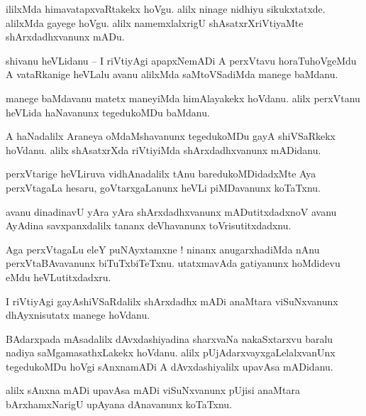 \documentclass{article}
\begin{document}
\begin{mn}%
ililxMda himavatapxvaRtakekx hoVgu. alilx ninage nidhiyu sikukxtatxde. alilxMda gayege hoVgu. alilx 
namemxlalxrigU shAsatxrXriVtiyaMte shArxdadhxvanunx mADu.
\end{mn}

\begin{mn}%
shivanu heVLidanu -- I riVtiyAgi apapxNemADi A perxVtavu horaTuhoVgeMdu A vataRkanige heVLalu avanu 
alilxMda saMtoVSadiMda manege baMdanu.
\end{mn}

\begin{mn}%
manege baMdavanu matetx maneyiMda himAlayakekx hoVdanu. alilx perxVtanu heVLida haNavanunx 
tegedukoMDu baMdanu.
\end{mn}

\begin{mn}%
A haNadalilx Araneya oMdaMshavanunx tegedukoMDu gayA shiVSaRkekx hoVdanu. alilx shAsatxrXda 
riVtiyiMda shArxdadhxvanunx mADidanu.
\end{mn}

\begin{mn}%
perxVtarige heVLiruva vidhAnadalilx tAnu baredukoMDidadxMte Aya perxVtagaLa hesaru, goVtarxgaLanunx 
heVLi piMDavanunx koTaTxnu.
\end{mn}

\begin{mn}%
avanu dinadinavU yAra yAra shArxdadhxvanunx mADutitxdadxnoV avanu AyAdina savxpanxdalilx tananx 
deVhavanunx toVrisutitxdadxnu.
\end{mn}

\begin{mn}%
Aga perxVtagaLu eleY puNAyxtamxne ! ninanx anugarxhadiMda nAnu perxVtaBAvavanunx biTuTxbiTeTxnu. 
utatxmavAda gatiyanunx hoMdidevu eMdu heVLutitxdadxru.
\end{mn}

\begin{mn}%
I riVtiyAgi gayAshiVSaRdalilx shArxdadhx mADi anaMtara viSuNxvanunx dhAyxnisutatx manege hoVdanu.
\end{mn}

\begin{mn}%
BAdarxpada mAsadalilx dAvxdashiyadina sharxvaNa nakaSxtarxvu baralu nadiya saMgamasathxLakekx 
hoVdanu. alilx pUjAdarxvayxgaLelalxvanUnx tegedukoMDu hoVgi sAnxnamADi A dAvxdashiyalilx upavAsa 
mADidanu.
\end{mn}

\begin{mn}%
alilx sAnxna mADi upavAsa mADi viSuNxvanunx pUjisi anaMtara bArxhamxNarigU upAyana dAnavanunx 
koTaTxnu. 
\end{mn}
\end{document}
